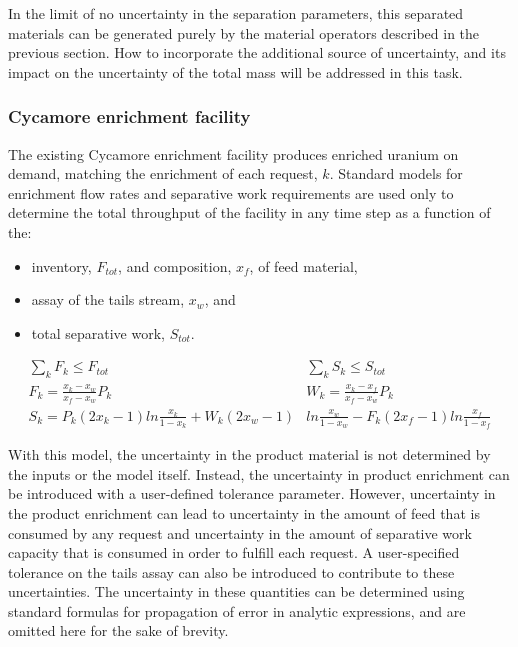 \documentclass[dvips,12pt]{article}
\begin{document}
In the limit of no uncertainty in the separation
parameters, this separated materials can be
generated purely by the material operators
described in the previous section.  How to
incorporate the additional source of uncertainty,
and its impact on the uncertainty of the total
mass will be addressed in this task.

\subsubsection{Cycamore enrichment facility}

The existing Cycamore enrichment facility produces
enriched uranium on demand, matching the
enrichment of each request, $k$.  Standard models
for enrichment flow rates and separative work
requirements are used only to determine the total
throughput of the facility in any time step as a
function of the:
\begin{itemize}[nosep]
\item inventory, $F_{tot}$, and composition,
  $x_f$, of feed material,
\item assay of the tails stream, $x_w$, and
\item total separative work, $S_{tot}$.
\end{itemize}
\begin{align*}
  \sum_k{F_k} \leq F_{tot}\qquad\qquad
  &\sum_k{S_k} \leq S_{tot}\\
  F_k = \frac{x_k - x_w}{x_f - x_w} P_k\qquad\qquad\qquad
  &W_k = \frac{x_k - x_f}{x_f - x_w} P_k\\
  S_k =  P_k\left(2x_k-1\right)ln\frac{x_k}{1-x_k}
         +W_k\left(2x_w-1\right)&ln\frac{x_w}{1-x_w}  
         -F_k\left(2x_f-1\right)ln\frac{x_f}{1-x_f}
\end{align*}

With this model, the uncertainty in the product
material is not determined by the inputs or the
model itself.  Instead, the uncertainty in product
enrichment can be introduced with a user-defined
tolerance parameter.  However, uncertainty in
the product enrichment can lead to uncertainty in
the amount of feed that is consumed by any request
and uncertainty in the amount of separative work
capacity that is consumed in order to fulfill each
request.  A user-specified tolerance on the tails
assay can also be introduced to contribute to
these uncertainties.  The uncertainty in these 
quantities can be determined using standard
formulas for propagation of error in analytic
expressions, and are omitted here for the sake of 
brevity.
\end{document}
